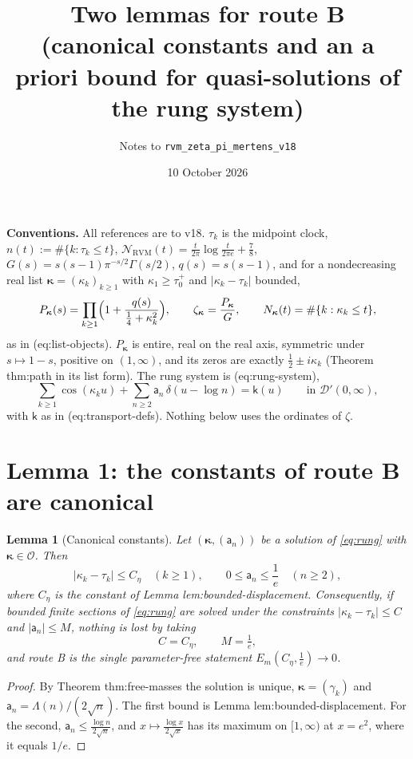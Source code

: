 \documentclass[11pt]{article}
\title{Two lemmas for route B\\ \large (canonical constants and an a priori bound for quasi-solutions of the rung system)}
\author{Notes to \texttt{rvm\_zeta\_pi\_mertens\_v18}}
\date{10 October 2026}
\newtheorem{lemma}{Lemma}
\newcommand{\RVM}{\mathrm{RVM}}
\newcommand{\NR}{\mathcal N_{\RVM}}
\begin{document}
\maketitle

\noindent\textbf{Conventions.} All references are to v18. $\tau_k$ is the midpoint clock, $n(t):=\#\{k:\tau_k\le t\}$, $\NR(t)=\frac t{2\pi}\log\frac t{2\pi e}+\frac78$, $G(s)=s(s-1)\pi^{-s/2}\Gamma(s/2)$, $q(s)=s(s-1)$, and for a nondecreasing real list $\boldsymbol\kappa=(\kappa_k)_{k\ge1}$ with $\kappa_1\ge\tau_0^+$ and $|\kappa_k-\tau_k|$ bounded,
\[
 P_{\boldsymbol\kappa}(s)=\prod_{k\ge1}\Bigl(1+\frac{q(s)}{\frac14+\kappa_k^2}\Bigr),\qquad
 \zeta_{\boldsymbol\kappa}=\frac{P_{\boldsymbol\kappa}}{G},\qquad
 N_{\boldsymbol\kappa}(t)=\#\{k:\kappa_k\le t\},
\]
as in (eq:list-objects). $P_{\boldsymbol\kappa}$ is entire, real on the real axis, symmetric under $s\mapsto1-s$, positive on $(1,\infty)$, and its zeros are exactly $\frac12\pm i\kappa_k$ (Theorem thm:path in its list form). The rung system is (eq:rung-system),
\begin{equation}\label{eq:rung}
 \sum_{k\ge1}\cos(\kappa_ku)+\sum_{n\ge2}\mathsf a_n\,\delta(u-\log n)=\mathsf k(u)\qquad\text{in }\mathcal D'(0,\infty),
\end{equation}
with $\mathsf k$ as in (eq:transport-defs). Nothing below uses the ordinates of $\zeta$.

\section*{Lemma 1: the constants of route B are canonical}

\begin{lemma}[Canonical constants]\label{lem:canonical}
Let $(\boldsymbol\kappa,(\mathsf a_n))$ be a solution of \eqref{eq:rung} with $\boldsymbol\kappa\in\mathscr O$. Then
\[
 |\kappa_k-\tau_k|\le C_\eta\quad(k\ge1),\qquad 0\le\mathsf a_n\le\frac1e\quad(n\ge2),
\]
where $C_\eta$ is the constant of Lemma lem:bounded-displacement. Consequently, if bounded finite sections of \eqref{eq:rung} are solved under the constraints $|\kappa_k-\tau_k|\le C$ and $|\mathsf a_n|\le M$, nothing is lost by taking
\[
 C=C_\eta,\qquad M=\tfrac1e,
\]
and route B is the single parameter-free statement $E_m(C_\eta,\tfrac1e)\to0$.
\end{lemma}

\begin{proof}
By Theorem thm:free-masses the solution is unique, $\boldsymbol\kappa=(\gamma_k)$ and $\mathsf a_n=\Lambda(n)/(2\sqrt n)$. The first bound is Lemma lem:bounded-displacement. For the second, $\mathsf a_n\le\frac{\log n}{2\sqrt n}$, and $x\mapsto\frac{\log x}{2\sqrt x}$ has its maximum on $[1,\infty)$ at $x=e^2$, where it equals $1/e$.
\end{proof}
\end{document}
